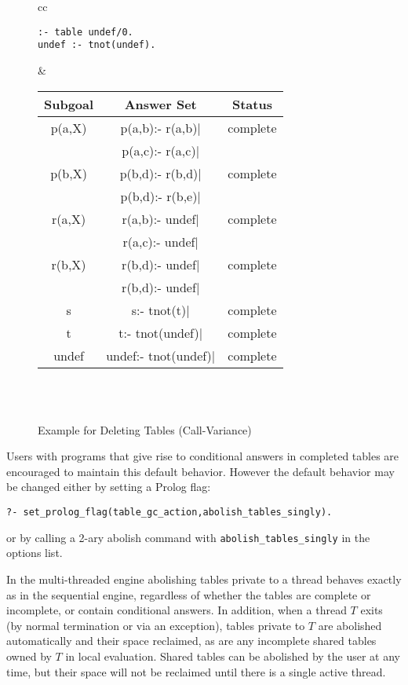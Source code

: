 \begin{description}
\begin{figure}[htb]
\begin{center}
\begin{tabular}{cc}
\begin{minipage}{14.5em}
\begin{verbatim}
:- table undef/0.
undef :- tnot(undef).
\end{verbatim}
\end{minipage}
&
\begin{tabular}{|c|c|c|} \hline
  Subgoal & Answer Set & Status\\ \hline \hline
  p(a,X)  & p(a,b):- r(a,b)$|$ & complete \\ 
          & p(a,c):- r(a,c)$|$ & \\ \hline
  p(b,X)  & p(b,d):- r(b,d)$|$ & complete \\ 
          & p(b,d):- r(b,e)$|$ & \\ \hline \hline
  r(a,X)  & r(a,b):- undef$|$  & complete \\ 
          & r(a,c):- undef$|$  & \\ \hline
  r(b,X)  & r(b,d):- undef$|$  & complete \\ 
          & r(b,d):- undef$|$  & \\ \hline \hline
  s       & s:- tnot(t)$|$     & complete \\ \hline \hline
  t       & t:- tnot(undef)$|$ & complete \\ \hline \hline
  undef   & undef:- tnot(undef)$|$ & complete \\ \hline \hline
\end{tabular} \\
\vspace*{-2ex} \\ \hline \hline
\end{tabular}
\end{center}
\caption{Example for Deleting Tables (Call-Variance)} \label{ex:deletion}
\end{figure}

Users with programs that give rise to conditional answers in completed
tables are encouraged to maintain this default behavior.  However the
default behavior may be changed either by setting a Prolog flag:
%
\begin{verbatim}
?- set_prolog_flag(table_gc_action,abolish_tables_singly).
\end{verbatim}
%
or by calling a 2-ary abolish command with {\tt abolish\_tables\_singly}
in the options list.

In the multi-threaded engine abolishing tables private to a thread
behaves exactly as in the sequential engine, regardless of whether the
tables are complete or incomplete, or contain conditional answers.  In
addition, when a thread $T$ exits (by normal termination or via an
exception), tables private to $T$ are abolished automatically and
their space reclaimed, as are any incomplete shared tables owned by
$T$ in local evaluation.  Shared tables can be abolished by the user
at any time, but their space will not be reclaimed until there is a
single active thread.


\end{description}
